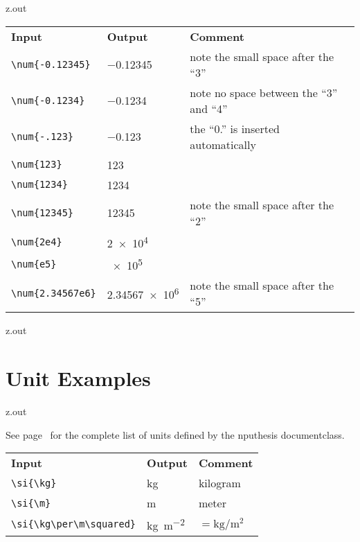 \begin{VerbatimOut}{z.out}
\noindent\begin{tabular}{@{}lll@{}}
  \bfseries Input& \bfseries Output& \bfseries Comment\\
  \tabularspace
  \verb+\num{-0.12345}+& \num{-0.12345}& note the small space after the ``3''\\
  \verb+\num{-0.1234}+&
    \num{-0.1234}&
    note no space between the ``3'' and ``4''\\
  \verb+\num{-.123}+& \num{-.123}& the ``0.'' is inserted automatically\\
  \verb+\num{123}+& \num{123}\\
  \verb+\num{1234}+& \num{1234}\\
  \verb+\num{12345}+& \num{12345}& note the small space after the ``2''\\
  \verb+\num{2e4}+& \num{2e4}\\
  \verb+\num{e5}+& \num{e5}\\
  \verb+\num{2.34567e6}+&
    \num{2.34567e6}&
    note the small space after the ``5''\\
\end{tabular}
\end{VerbatimOut}

\MyIO


\begin{VerbatimOut}{z.out}

\section{Unit Examples}
\end{VerbatimOut}

\MyIO


\begin{VerbatimOut}{z.out}

See page~\pageref{se:Complete-List-of-Units}
for the complete list
of units defined by the nputhesis documentclass.

\noindent\begin{tabular}{@{}lll@{}}
  \bfseries Input& \bfseries Output& \bfseries Comment\\
  \tabularspace
  \verb+\si{\kg}+& \si{\kg}& kilogram\\
  \verb+\si{\m}+& \si{\m}& meter\\
  \verb+\si{\kg\per\m\squared}+&
    \si{\kg\per\m\squared}&
    \(= \si{\kg}/\si{\m\squared}\)\\
\end{tabular}
\end{VerbatimOut}


